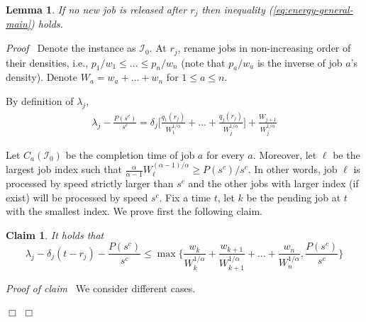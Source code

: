 \documentclass[11pt]{article}
\newenvironment{proof}{\noindent\emph{Proof\ }}{\hspace*{\fill}$\Box$\medskip}
\newenvironment{claimproof}{\noindent\emph{Proof of claim\ }}{\hspace*{\fill}$\Box$\medskip}
\newtheorem{lemma}{Lemma}
\newtheorem{claim}{Claim}
\begin{document}
\begin{lemma}		\label{lem:base}
If no new job is released after $r_{j}$ then inequality (\ref{eq:energy-general-main}) holds.
\end{lemma}
\begin{proof}
Denote the instance as $\mathcal{I}_{0}$.
At $r_{j}$, rename jobs in non-increasing order of their densities, i.e., 
$p_{1}/w_{1} \leq \ldots \leq p_{n}/w_{n}$ (note that $p_{a}/w_{a}$ is the inverse of job $a$'s density).
Denote $W_{a} = w_{a} + \ldots + w_{n}$ for $1 \leq a \leq n$.

By definition of $\lambda_{j}$,
\begin{align*}		\lambda_{j} - \frac{P(s^{c})}{s^{c}} 
	= \delta_{j}\biggl[ \frac{q_{1}(r_{j})}{ W_{1}^{1/\alpha}} + \ldots + \frac{q_{j}(r_{j})}{ W_{j}^{1/\alpha}} \biggl]
		+ \frac{W_{j+1}}{W_{j}^{1/\alpha}}
\end{align*}

Let $C_{a}(\mathcal{I}_{0})$ be the completion time of job $a$ for every $a$. Moreover,
let $\ell$ be the largest job index such that 
$\frac{\alpha}{\alpha-1}W_{\ell}^{(\alpha-1)/\alpha} \geq P(s^{c})/s^{c}$.
In other words, job $\ell$ is processed by speed strictly larger than $s^{c}$ and the other jobs
with larger index (if exist) will be processed by speed $s^{c}$.
Fix a time $t$, let $k$ be the pending job at $t$ with the smallest index.
We prove first the following claim.

\begin{claim}
It holds that
$$
\lambda_{j} - \delta_{j} (t-r_{j}) - \frac{P(s^{c})}{s^{c}}
\leq \max \biggl\{ \frac{w_{k}}{W_{k}^{1/\alpha}} + 
		\frac{w_{k+1}}{W_{k+1}^{1/\alpha}} + \ldots + \frac{w_{n}}{W_{n}^{1/\alpha}}, \frac{P(s^{c})}{s^{c}} \biggl\}
$$
\end{claim}
\begin{claimproof}
We consider different cases.

\end{claimproof}
\end{proof}
\end{document}
